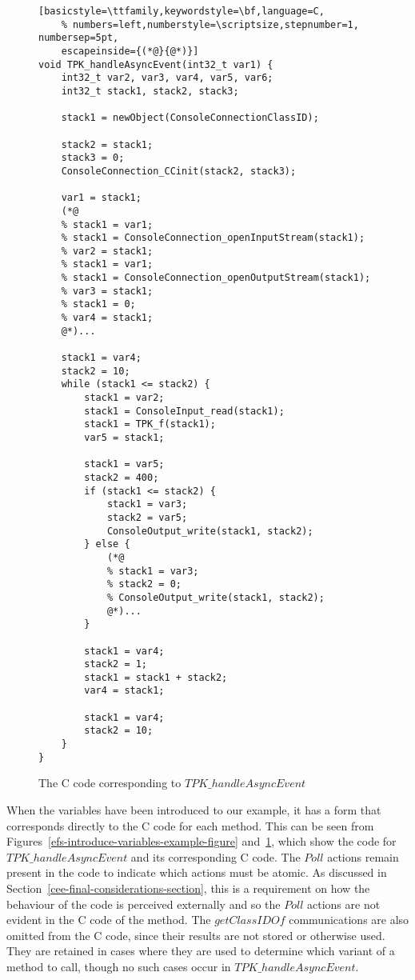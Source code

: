 \begin{figure}[tp!]
  \centering
  \setlength{\zedtab}{0.5cm}
  \setlength{\zedindent}{0pt}
  \setlength{\zedleftsep}{0pt}
  \setlength{\abovedisplayskip}{0pt}
  \setlength{\belowdisplayskip}{0pt}
  \setlength{\abovedisplayshortskip}{0pt}
  \setlength{\belowdisplayshortskip}{0pt}
  \begin{lstlisting}[basicstyle=\ttfamily,keywordstyle=\bf,language=C,
    % numbers=left,numberstyle=\scriptsize,stepnumber=1, numbersep=5pt,
    escapeinside={(*@}{@*)}]
void TPK_handleAsyncEvent(int32_t var1) {
    int32_t var2, var3, var4, var5, var6;
    int32_t stack1, stack2, stack3;

    stack1 = newObject(ConsoleConnectionClassID);

    stack2 = stack1;
    stack3 = 0;
    ConsoleConnection_CCinit(stack2, stack3);

    var1 = stack1;
    (*@
    % stack1 = var1;
    % stack1 = ConsoleConnection_openInputStream(stack1);
    % var2 = stack1;
    % stack1 = var1;
    % stack1 = ConsoleConnection_openOutputStream(stack1);
    % var3 = stack1;
    % stack1 = 0;
    % var4 = stack1;
    @*)...

    stack1 = var4;
    stack2 = 10;
    while (stack1 <= stack2) {
        stack1 = var2;
        stack1 = ConsoleInput_read(stack1);
        stack1 = TPK_f(stack1);
        var5 = stack1;
        
        stack1 = var5;
        stack2 = 400;
        if (stack1 <= stack2) {  
            stack1 = var3;
            stack2 = var5;
            ConsoleOutput_write(stack1, stack2);
        } else {
            (*@
            % stack1 = var3;
            % stack2 = 0;
            % ConsoleOutput_write(stack1, stack2);
            @*)...
        }
          
        stack1 = var4;
        stack2 = 1;
        stack1 = stack1 + stack2;
        var4 = stack1;

        stack1 = var4;
        stack2 = 10;
    }
}
\end{lstlisting}
  \caption{The C code corresponding to $TPK\_handleAsyncEvent$}
  \label{efs-introduce-variables-c-code-figure}
\end{figure}

When the variables have been introduced to our example, it has a form
that corresponds directly to the C code for each method.
This can be seen from
Figures~\ref{efs-introduce-variables-example-figure}
and~\ref{efs-introduce-variables-c-code-figure}, which show the
\Circus{} code for $TPK\_handleAsyncEvent$ and its corresponding C
code.
The $Poll$ actions remain present in the \Circus{} code to indicate
which actions must be atomic.
As discussed in Section~\ref{cee-final-considerations-section}, this
is a requirement on how the behaviour of the code is perceived
externally and so the $Poll$ actions are not evident in the C code of
the method.
The $getClassIDOf$ communications are also omitted from the C code,
since their results are not stored or otherwise used. 
They are retained in cases where they are used to determine which
variant of a method to call, though no such cases occur in
$TPK\_handleAsyncEvent$.
